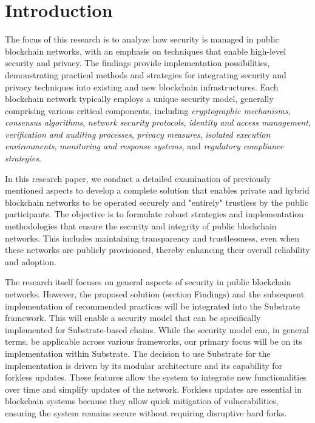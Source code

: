\section{Introduction}
The focus of this research is to analyze how security is managed in public blockchain networks, with an emphasis on techniques that enable high-level security and privacy. The findings provide implementation possibilities, demonstrating practical methods and strategies for integrating security and privacy techniques into existing and new blockchain infrastructures. Each blockchain network typically employs a unique security model, generally comprising various critical components, including \textit{cryptographic mechanisms}, \textit{consensus algorithms}, \textit{network security protocols}, \textit{identity and access management}, \textit{verification and auditing processes}, \textit{privacy measures}, \textit{isolated execution environments}, \textit{monitoring and response systems}, and \textit{regulatory compliance strategies}.

In this research paper, we conduct a detailed examination of previously mentioned aspects to develop a complete solution that enables private and hybrid blockchain networks to be operated securely and "entirely" trustless by the public participants. The objective is to formulate robust strategies and implementation methodologies that ensure the security and integrity of public blockchain networks. This includes maintaining transparency and trustlessness, even when these networks are publicly provisioned, thereby enhancing their overall reliability and adoption.

The research itself focuses on general aspects of security in public blockchain networks. However, the proposed solution (section Findings) and the subsequent implementation of recommended practices will be integrated into the Substrate framework. This will enable a security model that can be specifically implemented for Substrate-based chains. While the security model can, in general terms, be applicable across various frameworks, our primary focus will be on its implementation within Substrate. The decision to use Substrate for the implementation is driven by its modular architecture and its capability for forkless updates. These features allow the system to integrate new functionalities over time and simplify updates of the network. Forkless updates are essential in blockchain systems because they allow quick mitigation of vulnerabilities, ensuring the system remains secure without requiring disruptive hard forks.

